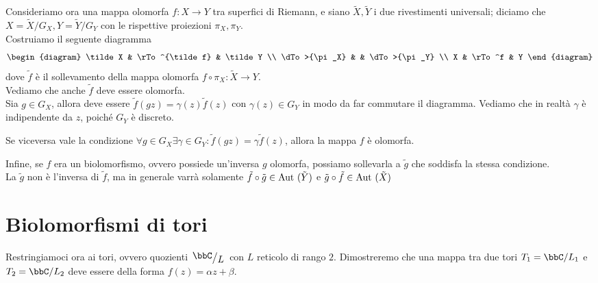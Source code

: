 Consideriamo ora una mappa olomorfa $f:X\to Y$ tra superfici di Riemann, e siano $\tilde X,\tilde Y$ i due rivestimenti universali; diciamo che $X=\tilde X / G_X,Y=\tilde Y / G_Y$ con le rispettive proiezioni $\pi_X,\pi_Y$.\\
Costruiamo il seguente diagramma
\[
    \begin{diagram}
        \tilde X  		& \rTo^{\tilde f} 	& \tilde Y 		 	\\
        \dTo>{\pi_X}	&					& \dTo>{\pi_Y}		\\
        X   			& \rTo^f 			& Y
    \end{diagram}
\]
dove $\tilde f$ è il sollevamento della mappa olomorfa $f\circ\pi_X:\tilde X\to Y$.\\
Vediamo che anche $\tilde f$ deve essere olomorfa.\\
Sia $g\in G_X$, allora deve essere $\tilde f(gz)=\gamma(z)\tilde f(z)$ con $\gamma(z)\in G_Y$ in modo da far commutare il diagramma. Vediamo che in realtà $\gamma$ è indipendente da $z$, poiché $G_Y$ è discreto.\\
\begin{osservazione}
    Se viceversa vale la condizione $\forall g\in G_X\exists\gamma\in G_Y: \tilde f(gz)=\gamma\tilde f(z)$, allora la mappa $f$ è olomorfa.
\end{osservazione}

Infine, se $f$ era un biolomorfismo, ovvero possiede un'inversa $g$ olomorfa, possiamo sollevarla a $\tilde g$ che soddisfa la stessa condizione.\\
 La $\tilde g$ non è l'inversa di $\tilde f$, ma in generale varrà solamente $\tilde f\circ\tilde g\in\text{Aut }(\tilde Y)$ e $\tilde g\circ\tilde f\in\text{Aut }(\tilde X)$




\section{Biolomorfismi di tori}
Restringiamoci ora ai tori, ovvero quozienti $\quotient{\bbC}{L}$ con $L$ reticolo di rango $2$. Dimostreremo che una mappa tra due tori $T_1 = \bbC/L_1$ e $T_2 = \bbC/L_2$ deve essere della forma $f(z)=\alpha z + \beta$.


